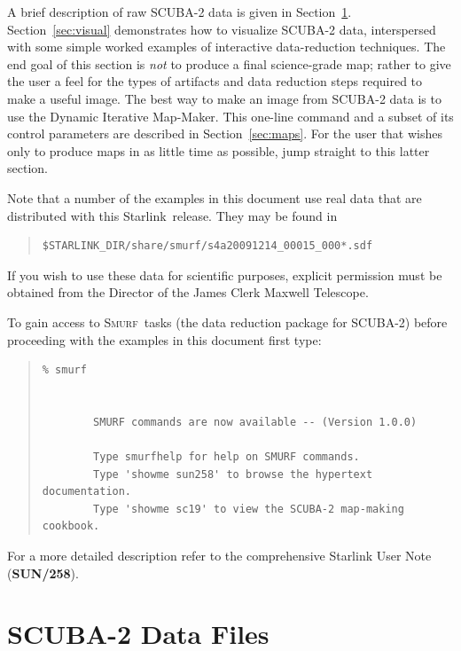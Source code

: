 \documentclass[twoside,11pt]{article}
\newenvironment{myquote}{\begin{quote}\begin{small}}{\end{small}\end{quote}}
\newcommand{\starlink}{\htmladdnormallink{Starlink}{http://starlink.jach.hawaii.edu}}
\newcommand{\smurf}{\xref{\textsc{Smurf}}{sun258}{}}
\newcommand{\htmladdnormallink}[2]{#1}
\newcommand{\xref}[3]{#1}
\newcommand{\xlabel}[1]{}
\renewcommand{\_}{\texttt{\symbol{95}}}
\begin{document}
A brief description of raw SCUBA-2 data is given in
Section~\ref{sec:data}. Section~\ref{sec:visual} demonstrates how to
visualize SCUBA-2 data, interspersed with some simple worked examples
of interactive data-reduction techniques. The end goal of this section
is {\em not} to produce a final science-grade map; rather to give the
user a feel for the types of artifacts and data reduction steps
required to make a useful image. The best way to make an image from
SCUBA-2 data is to use the Dynamic Iterative Map-Maker. This one-line
command and a subset of its control parameters are described in
Section~\ref{sec:maps}. For the user that wishes only to produce maps
in as little time as possible, jump straight to this latter section.

Note that a number of the examples in this document use real data that
are distributed with this \starlink\ release. They may be found in

\begin{myquote}
\begin{verbatim}
$STARLINK_DIR/share/smurf/s4a20091214_00015_000*.sdf
\end{verbatim}
\end{myquote}

If you wish to use these data for scientific purposes, explicit
permission must be obtained from the Director of the James Clerk
Maxwell Telescope.

To gain access to \smurf\ tasks (the data reduction package for
SCUBA-2) before proceeding with the examples in this document first
type:

\begin{myquote}
\begin{verbatim}
% smurf


        SMURF commands are now available -- (Version 1.0.0)

        Type smurfhelp for help on SMURF commands.
        Type 'showme sun258' to browse the hypertext documentation.
        Type 'showme sc19' to view the SCUBA-2 map-making cookbook.

\end{verbatim}
\end{myquote}
%

For a more detailed description refer to the comprehensive Starlink
User Note (\xref{\textbf{SUN/258}}{sun258}{}).


\section{\xlabel{data_files}SCUBA-2 Data Files}
\label{sec:data}
\end{document}
